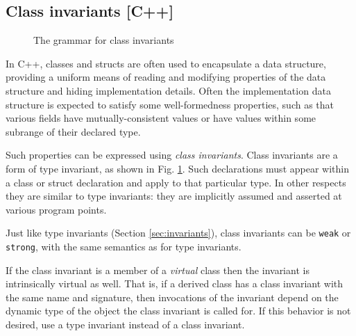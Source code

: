 \subsection{Class invariants [C++]}

\begin{figure}[htp]
\begin{cadre}

\end{cadre}
\caption{The grammar for class invariants}
\label{fig:gram:classinvariant}
\end{figure}

In C++, classes and structs are often used to encapsulate a data structure, 
providing a uniform means of reading and modifying properties of the data
structure and hiding implementation details. Often the implementation
data structure is expected to satisfy some well-formedness properties, such as
that various fields have mutually-consistent values or have values within
some subrange of their declared type.

Such properties can be expressed using \textit{class invariants}. Class invariants
are a form of type invariant, as shown in Fig. \ref{fig:gram:classinvariant}.
Such declarations must appear within a class or struct declaration and 
apply to that particular type. In other respects they are similar to 
type invariants: they are implicitly assumed and asserted at various
program points.

Just like type invariants (Section \ref{sec:invariants}), class invariants can be \lstinline|weak| or \lstinline|strong|, with the same semantics as for type invariants.

If the class invariant is a member of a \textit{virtual} class then
the invariant is intrinsically virtual as well. That is, if a derived
class has a class invariant with the same name and signature, then
invocations of the invariant depend on the dynamic type of the
object the class invariant is called for. If this behavior is not
desired, use a type invariant instead of a class invariant.
